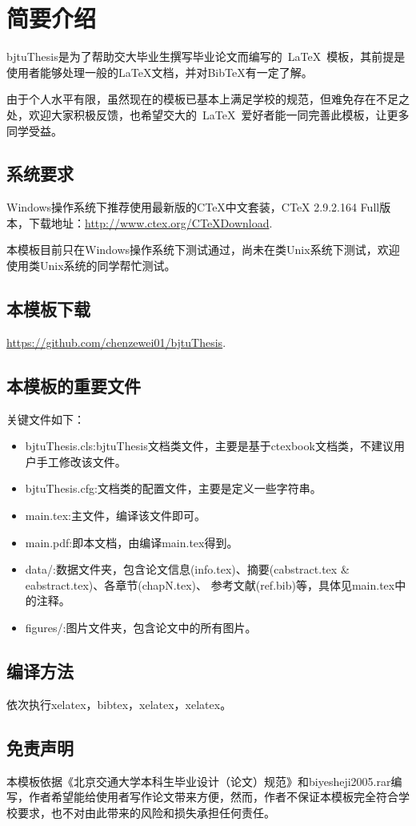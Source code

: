 \chapter{简要介绍}
bjtuThesis是为了帮助交大毕业生撰写毕业论文而编写的~\LaTeX{}~模板，其前提是使用者能够处理一般的LaTeX文档，并对BibTeX有一定了解。\par
由于个人水平有限，虽然现在的模板已基本上满足学校的规范，但难免存在不足之处，欢迎大家积极反馈，也希望交大的~\LaTeX{}~爱好者能一同完善此模板，让更多同学受益。
\section{系统要求}
Windows操作系统下推荐使用最新版的CTeX中文套装，CTeX 2.9.2.164 Full版本，下载地址：\url{http://www.ctex.org/CTeXDownload}. \par
本模板目前只在Windows操作系统下测试通过，尚未在类Unix系统下测试，欢迎使用类Unix系统的同学帮忙测试。
\section{本模板下载}
\url{https://github.com/chenzewei01/bjtuThesis}.
\section{本模板的重要文件}
关键文件如下：
\begin{itemize}
  \item bjtuThesis.cls:bjtuThesis文档类文件，主要是基于ctexbook文档类，不建议用户手工修改该文件。
  \item bjtuThesis.cfg:文档类的配置文件，主要是定义一些字符串。
  \item main.tex:主文件，编译该文件即可。
  \item main.pdf:即本文档，由编译main.tex得到。
  \item data/:数据文件夹，包含论文信息(info.tex)、摘要(cabstract.tex \& eabstract.tex)、各章节(chapN.tex)、 参考文献(ref.bib)等，具体见main.tex中的注释。
  \item figures/:图片文件夹，包含论文中的所有图片。

\end{itemize}
\section{编译方法}
依次执行xelatex，bibtex，xelatex，xelatex。
\section{免责声明}
本模板依据《北京交通大学本科生毕业设计（论文）规范》和biyesheji2005.rar编写，作者希望能给使用者写作论文带来方便，然而，作者不保证本模板完全符合学校要求，也不对由此带来的风险和损失承担任何责任。